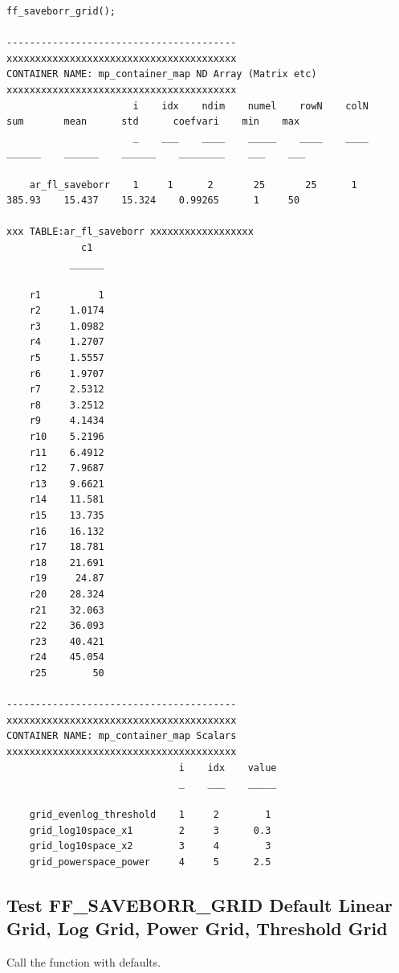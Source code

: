 \documentclass[
]{book}
\begin{document}
\begin{verbatim}
ff_saveborr_grid();

----------------------------------------
xxxxxxxxxxxxxxxxxxxxxxxxxxxxxxxxxxxxxxxx
CONTAINER NAME: mp_container_map ND Array (Matrix etc)
xxxxxxxxxxxxxxxxxxxxxxxxxxxxxxxxxxxxxxxx
                      i    idx    ndim    numel    rowN    colN     sum       mean      std      coefvari    min    max
                      _    ___    ____    _____    ____    ____    ______    ______    ______    ________    ___    ___

    ar_fl_saveborr    1     1      2       25       25      1      385.93    15.437    15.324    0.99265      1     50 

xxx TABLE:ar_fl_saveborr xxxxxxxxxxxxxxxxxx
             c1  
           ______

    r1          1
    r2     1.0174
    r3     1.0982
    r4     1.2707
    r5     1.5557
    r6     1.9707
    r7     2.5312
    r8     3.2512
    r9     4.1434
    r10    5.2196
    r11    6.4912
    r12    7.9687
    r13    9.6621
    r14    11.581
    r15    13.735
    r16    16.132
    r17    18.781
    r18    21.691
    r19     24.87
    r20    28.324
    r21    32.063
    r22    36.093
    r23    40.421
    r24    45.054
    r25        50

----------------------------------------
xxxxxxxxxxxxxxxxxxxxxxxxxxxxxxxxxxxxxxxx
CONTAINER NAME: mp_container_map Scalars
xxxxxxxxxxxxxxxxxxxxxxxxxxxxxxxxxxxxxxxx
                              i    idx    value
                              _    ___    _____

    grid_evenlog_threshold    1     2        1 
    grid_log10space_x1        2     3      0.3 
    grid_log10space_x2        3     4        3 
    grid_powerspace_power     4     5      2.5 
\end{verbatim}

\hypertarget{test-ff_saveborr_grid-default-linear-grid-log-grid-power-grid-threshold-grid}{%
\subsection{Test FF\_SAVEBORR\_GRID Default Linear Grid, Log Grid, Power Grid, Threshold Grid}\label{test-ff_saveborr_grid-default-linear-grid-log-grid-power-grid-threshold-grid}}

Call the function with defaults.
\end{document}
